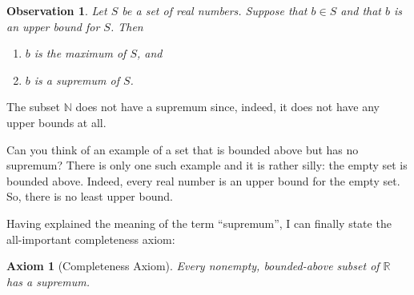 \documentclass[12pt]{amsart}
\newcommand{\R}{{\mathbb{R}}}
\newcommand{\N}{\mathbb{N}}
\numberwithin{equation}{section}
\theoremstyle{plain} %
\newtheorem{obs}{Observation}
\newtheorem*{question}{Question}
\newtheorem*{axiom*}{Axiom}
\theoremstyle{definition}
\theoremstyle{remark}
\begin{document}
\begin{obs} Let $S$ be a set of real numbers. Suppose that $b\in S$ and that $b$ is an upper bound for $S$. Then
\begin{enumerate}
\item $b$ is the maximum of $S$, and 
\item $b$ is a supremum of $S$.
\end{enumerate}
\end{obs}

The subset $\N$ does not have a supremum since, indeed, it does not have any upper bounds at all.




Can you think of an example of a set that is bounded above but has no supremum? There is only one such example and it is rather silly: the empty set is
bounded above. Indeed, every real number is an upper bound for the empty set. So, there is no least upper bound.

Having explained the meaning of the term ``supremum'', I can finally state the all-important completeness axiom:


\begin{axiom*}[Completeness Axiom] Every nonempty, bounded-above subset of $\R$ has a supremum.
\end{axiom*}
\end{document}
